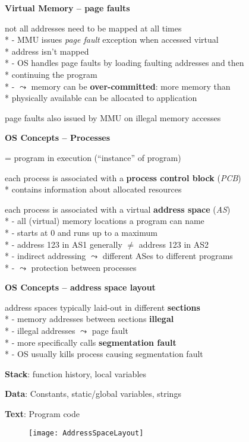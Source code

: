 \textbf{Virtual Memory -- page faults}
\begin{items}
	\item not all addresses need to be mapped at all times
		\\*
		- MMU issues \emph{page fault} exception when accessed virtual \\* \phantom{-} address isn't mapped
		\\*
		- OS handles page faults by loading faulting addresses and then \\* \phantom{-} continuing the program
		\\*
		- \( \leadsto \) memory can be \textbf{over-committed}: more memory than \\* \phantom{-} physically available can be allocated to application
	\item page faults also issued by MMU on illegal memory accesses
\end{items}

\textbf{OS Concepts -- Processes}
\begin{items}
	\item = program in execution ("`instance"' of program)
	\item each process is associated with a \textbf{process control block} (\emph{PCB})
		\\*
		contains information about allocated resources
	\item each process is associated with a virtual \textbf{address space} (\emph{AS})
		\\*
		- all (virtual) memory locations a program can name
		\\*
		- starts at 0 and runs up to a maximum
		\\*
		- address 123 in AS1 generally \( \neq \) address 123 in AS2
		\\*
		- indirect addressing \( \leadsto \) different ASes to different programs
		\\*
		- \( \leadsto \) protection between processes
\end{items}

\newpage

\textbf{OS Concepts -- address space layout}
\begin{items}
	\item address spaces typically laid-out in different \textbf{sections}
		\\*
		- memory addresses between sections \textbf{illegal}
		\\*
		- illegal addresses \( \leadsto \) page fault
		\\*
		- more specifically calls \textbf{segmentation fault}
		\\*
		- OS usually kills process causing segmentation fault
	\item \textbf{Stack}: function history, local variables
	\item \textbf{Data}: Constants, static/global variables, strings
	\item \textbf{Text}: Program code
	\begin{figure}[H]\centering\label{AddressSpaceLayout}\texttt{[image: AddressSpaceLayout]}\end{figure}
\end{items}

